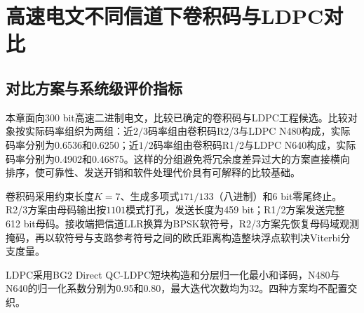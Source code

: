 \chapter{高速电文不同信道下卷积码与LDPC对比}\label{chap:multichannel}

\begingroup
\captionsetup{font=small,labelfont=normalfont,skip=0.6em}

\section{对比方案与系统级评价指标}

本章面向300 bit高速二进制电文，比较已确定的卷积码与LDPC工程候选。比较对象按实际码率组织为两组：近$2/3$码率组由卷积码R2/3与LDPC N480构成，实际码率分别为0.6536和0.6250；近$1/2$码率组由卷积码R1/2与LDPC N640构成，实际码率分别为0.4902和0.46875。这样的分组避免将冗余度差异过大的方案直接横向排序，使可靠性、发送开销和软件处理代价具有可解释的比较基础。

卷积码采用约束长度$K=7$、生成多项式$171/133$（八进制）和6 bit零尾终止。R2/3方案由母码输出按$1101$模式打孔，发送长度为459 bit；R1/2方案发送完整612 bit母码。接收端把信道LLR换算为BPSK软符号，R2/3方案先恢复母码域观测掩码，再以软符号与支路参考符号之间的欧氏距离构造整块浮点软判决Viterbi分支度量。

LDPC采用BG2 Direct QC-LDPC短块构造和分层归一化最小和译码，N480与N640的归一化系数分别为0.95和0.80，最大迭代次数均为32。四种方案均不配置交织。

\begin{table}[htbp]
  \centering\scriptsize
  \caption{高速电文正式比较方案}
  \label{tab:s5-schemes}
\end{table}

